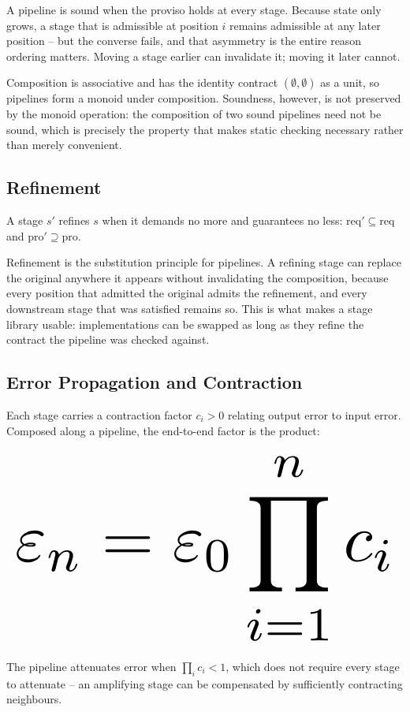 \documentclass[10pt,twocolumn,letterpaper]{article}
\begin{document}
A pipeline is sound when the proviso holds at every stage. Because state only grows, a stage that is admissible at position $i$ remains admissible at any later position -- but the converse fails, and that asymmetry is the entire reason ordering matters. Moving a stage earlier can invalidate it; moving it later cannot.

Composition is associative and has the identity contract $(\emptyset, \emptyset)$ as a unit, so pipelines form a monoid under composition. Soundness, however, is not preserved by the monoid operation: the composition of two sound pipelines need not be sound, which is precisely the property that makes static checking necessary rather than merely convenient.


\subsection{Refinement}


A stage $s'$ refines $s$ when it demands no more and guarantees no less: $\mathrm{req}' \subseteq \mathrm{req}$ and $\mathrm{pro}' \supseteq \mathrm{pro}$.

Refinement is the substitution principle for pipelines. A refining stage can replace the original anywhere it appears without invalidating the composition, because every position that admitted the original admits the refinement, and every downstream stage that was satisfied remains so. This is what makes a stage library usable: implementations can be swapped as long as they refine the contract the pipeline was checked against.


\subsection{Error Propagation and Contraction}


Each stage carries a contraction factor $c_i > 0$ relating output error to input error. Composed along a pipeline, the end-to-end factor is the product:




\begin{equation}
\resizebox{\columnwidth}{!}{$\displaystyle
\begin{aligned}
\varepsilon_n = \varepsilon_0 \prod_{i=1}^{n} c_i
\end{aligned}
$}
\end{equation}




The pipeline attenuates error when $\prod_i c_i < 1$, which does not require every stage to attenuate -- an amplifying stage can be compensated by sufficiently contracting neighbours.
\end{document}
